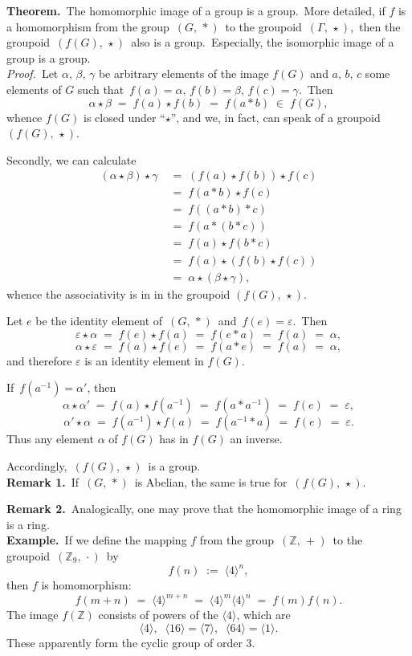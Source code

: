 \documentclass[12pt]{article}
\theoremstyle{definition}
\begin{document}
\textbf{Theorem.}\, The homomorphic image of a group is a group.\, More detailed, if $f$ is a homomorphism from the group\, $(G,\,\ast)$\, to the groupoid \,$(\Gamma,\,\star)$,\, then the groupoid\, $(f(G),\,\star)$\, also is a group.\, Especially, the isomorphic image of a group is a group.\\

\emph{Proof.}\, Let $\alpha,\,\beta,\,\gamma$ be arbitrary elements of the image $f(G)$ and $a,\,b,\,c$ some elements of $G$ such that\, $f(a) = \alpha,\, f(b) = \beta,\, f(c) = \gamma$.\, Then 
$$\alpha \star \beta \;=\; f(a) \star f(b) \;=\; f(a \ast b) \;\in\; f(G),$$
whence $f(G)$ is closed under ``$\star$'', and we, in fact, can speak of a groupoid\, $(f(G),\,\star)$.

Secondly, we can calculate
\begin{align*}
(\alpha\star\beta)\star\gamma &\;=\; (f(a) \star f(b)) \star f(c)\\
&\;=\; f(a \ast b) \star f(c)\\
&\;=\; f((a \ast b) \ast c)\\
&\;=\; f(a \ast(b \ast c))\\
&\;=\; f(a) \star f(b \ast c)\\
&\;=\; f(a) \star (f(b) \star f(c))\\
&\;=\; \alpha \star (\beta \star \gamma),
\end{align*}
whence the associativity is in  in the groupoid $(f(G),\,\star)$.

Let $e$ be the identity element of\, $(G,\,\ast)$\, and\, $f(e) = \varepsilon$.\, Then
$$\varepsilon \star \alpha \;=\; f(e) \star f(a) \;=\; f(e \ast a) \;=\; f(a) \;=\; \alpha,$$
$$\alpha \star \varepsilon \;=\; f(a) \star f(e) \;=\; f(a \ast e) \;=\; f(a) \;=\; \alpha,$$
and therefore $\varepsilon$ is an identity element in $f(G)$.

If\, $f(a^{-1}) = \alpha'$, then
$$\alpha \star \alpha' \;=\; f(a) \star f(a^{-1}) \;=\; f(a \ast a^{-1}) \;=\; f(e) \;=\; \varepsilon,$$
$$\alpha' \star \alpha \;=\; f(a^{-1}) \star f(a) \;=\; f(a^{-1} \ast a) \;=\; f(e) \;=\; \varepsilon.$$
Thus any element $\alpha$ of $f(G)$ has in $f(G)$ an inverse.

Accordingly,\, $(f(G),\, \star)$\, is a group.\\


\textbf{Remark 1.}\, If\, $(G,\,\ast)$\, is Abelian, the same is true for\, $(f(G),\, \star)$.

\textbf{Remark 2.}\, Analogically, one may prove that the homomorphic image of a ring is a ring.\\


\textbf{Example.}\, If we define the mapping $f$ from the group\, $(\mathbb{Z},\,+)$\, to the groupoid\, 
$(\mathbb{Z}_9,\,\cdot)$\, by
$$f(n) \;:=\; \langle4\rangle^n,$$
then $f$ is homomorphism:
$$f(m\!+\!n) \;=\; \langle4\rangle^{m+n} \;=\; \langle4\rangle^m\langle4\rangle^n \;=\; f(m)f(n).$$
The image $f(\mathbb{Z})$ consists of powers of the  $\langle4\rangle$, which are
$$\langle4\rangle,\;\; \langle16\rangle = \langle7\rangle,\;\; \langle64\rangle = \langle1\rangle.$$
These apparently form the cyclic group of order 3.

\end{document}
